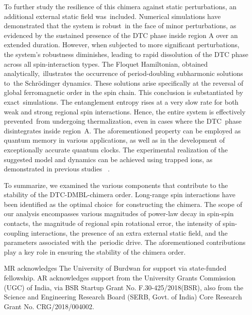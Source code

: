 \documentclass[%
nofootinbib,
reprint,
superscriptaddress,
amsmath,amssymb,showkeys,
aps,
prb,
]{revtex4-2}
\begin{document}
	To further study the resilience of this chimera against static perturbations, an additional external static field was included. Numerical simulations have demonstrated that the system is robust in the face of minor perturbations, as evidenced by the sustained presence of the DTC phase inside region A over an extended duration. However, when subjected to more significant perturbations, the system's robustness diminishes, leading to rapid dissolution of the DTC phase across all spin-interaction types. The Floquet Hamiltonian, obtained analytically, illustrates the occurrence of period-doubling subharmonic solutions to the Schr\"odinger dynamics. These solutions arise specifically at the reversal of global ferromagnetic order in the spin chain. This conclusion is substantiated by exact simulations. The entanglement entropy rises at a very slow rate for both weak and strong regional spin interactions. Hence, the entire system is effectively prevented from undergoing thermalization, even in cases where the DTC phase disintegrates inside region A. The aforementioned property can be employed as quantum memory in various applications, as well as in the development of exceptionally accurate quantum clocks. The experimental realization of the suggested model and dynamics can be achieved using trapped ions, as demonstrated in previous studies ~\cite{sakurai_phys_nodate, Friedenauer2008}.
	
	To summarize, we examined the various components that contribute to the stability of the DTC-DMBL-chimera order. Long-range spin interactions have been identified as the optimal choice for constructing the chimera. The scope of our analysis encompasses various magnitudes of power-law decay in spin-spin contacts, the magnitude of regional spin rotational error, the intensity of spin-coupling interactions, the presence of an extra external static field, and the parameters associated with the periodic drive. The aforementioned contributions play a key role in ensuring the stability of the chimera order.
	
	\begin{acknowledgments}
		MR acknowledges The University of Burdwan for support via state-funded fellowship. AR acknowledges support from the University Grants Commission (UGC) of India, via BSR Startup Grant No. F.30-425/2018(BSR), also from the Science and Engineering Research Board (SERB, Govt. of India) Core Research Grant No. CRG/2018/004002.
	\end{acknowledgments}
	
	
	\newpage
	\clearpage
	\appendix
	\onecolumngrid
\end{document}
